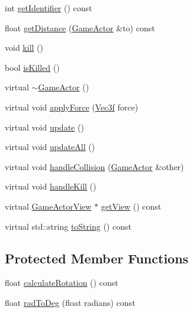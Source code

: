 \begin{DoxyCompactItemize}
\item 
int \hyperlink{class_game_actor_a64691c7e8f9d2d528d06323284a1d40c}{get\+Identifier} () const 
\item 
float \hyperlink{class_game_actor_a46068d92a30316a1bc86b3812fd255ce}{get\+Distance} (\hyperlink{class_game_actor}{Game\+Actor} \&to) const 
\item 
void \hyperlink{class_game_actor_a633b34eb69ad05477fd1d5b5de3c17b8}{kill} ()
\item 
bool \hyperlink{class_game_actor_a3ac80ca433821d22e545285c04cf38a1}{is\+Killed} ()
\item 
virtual \hyperlink{class_game_actor_a7becf6889c14e7df17e31ba0a3329d32}{$\sim$\+Game\+Actor} ()
\item 
virtual void \hyperlink{class_game_actor_ab7452d9bf99b4e6509ee96a717c992dd}{apply\+Force} (\hyperlink{class_vec3f}{Vec3f} force)
\item 
virtual void \hyperlink{class_game_actor_ab70229c740251fb7c4222bf579c59393}{update} ()
\item 
virtual void \hyperlink{class_game_actor_a2d3b93df5edf86dea7d65ab7dac0e3f7}{update\+All} ()
\item 
virtual void \hyperlink{class_game_actor_aba8cfb1004bf6fc17681cd595b706ada}{handle\+Collision} (\hyperlink{class_game_actor}{Game\+Actor} \&other)
\item 
virtual void \hyperlink{class_game_actor_a00cdd692fae4de9fb4ce6b2748754744}{handle\+Kill} ()
\item 
virtual \hyperlink{class_game_actor_view}{Game\+Actor\+View} $\ast$ \hyperlink{class_game_actor_ae63b522db0d88f56e3c7a8cfb60d31a6}{get\+View} () const 
\item 
virtual std\+::string \hyperlink{class_game_actor_a10bb2f607937d5b376c4e0d9bc304d1c}{to\+String} () const 
\end{DoxyCompactItemize}
\subsection*{Protected Member Functions}
\begin{DoxyCompactItemize}
\item 
float \hyperlink{class_game_actor_a9f520d6799654aefd20c7a73d6c00f12}{calculate\+Rotation} () const 
\item 
float \hyperlink{class_game_actor_aee1a09ea167d0cb5d7c2e9c381611405}{rad\+To\+Deg} (float radians) const 
\end{DoxyCompactItemize}
